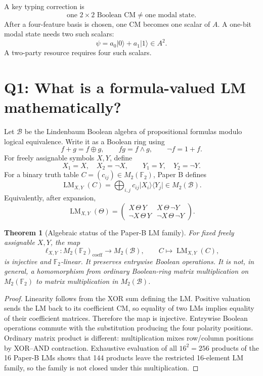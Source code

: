 \documentclass[11pt]{article}
\newtheorem{theorem}{Theorem}[section]
\theoremstyle{definition}
\newcommand{\F}{\mathbb{F}}
\newcommand{\B}{\mathcal{B}}
\newcommand{\LM}{\operatorname{LM}}
\begin{document}
A key typing correction is
\[
\boxed{\text{one }2\times2\text{ Boolean CM}\neq\text{one modal state}.}
\]
After a four-feature basis is chosen, one CM becomes one scalar of \(A\). A one-bit modal state needs
two such scalars:
\[
\psi=a_0\lvert0\rangle+a_1\lvert1\rangle\in A^2.
\]
A two-party resource requires four such scalars.

\section{Q1: What is a formula-valued LM mathematically?}

Let \(\B\) be the Lindenbaum Boolean algebra of propositional formulas modulo logical equivalence.
Write it as a Boolean ring using
\[
f+g=f\oplus g,\qquad fg=f\land g,\qquad \neg f=1+f.
\]
For freely assignable symbols \(X,Y\), define
\[
X_1=X,\quad X_2=\neg X,\qquad
Y_1=Y,\quad Y_2=\neg Y.
\]
For a binary truth table \(C=(c_{ij})\in M_2(\F_2)\), Paper B defines
\[
\LM_{X,Y}(C)
=
\bigoplus_{i,j}c_{ij}\lvert X_i\rangle\langle Y_j\rvert
\in M_2(\B).
\]
Equivalently, after expansion,
\[
\LM_{X,Y}(\Theta)
=
\begin{pmatrix}
X\,\Theta\,Y & X\,\Theta\,\neg Y\\
\neg X\,\Theta\,Y & \neg X\,\Theta\,\neg Y
\end{pmatrix}.
\]

\begin{theorem}[Algebraic status of the Paper-B LM family]
For fixed freely assignable \(X,Y\), the map
\[
\ell_{X,Y}:M_2(\F_2)_{\mathrm{coeff}}\longrightarrow M_2(\B),
\qquad C\longmapsto\LM_{X,Y}(C),
\]
is injective and \(\F_2\)-linear. It preserves entrywise Boolean operations. It is not, in general,
a homomorphism from ordinary Boolean-ring matrix multiplication on \(M_2(\F_2)\) to matrix
multiplication in \(M_2(\B)\).
\end{theorem}

\begin{proof}
Linearity follows from the XOR sum defining the LM. Positive valuation sends the LM back to its
coefficient CM, so equality of two LMs implies equality of their coefficient matrices. Therefore the
map is injective. Entrywise Boolean operations commute with the substitution producing the four
polarity positions. Ordinary matrix product is different: multiplication mixes row/column positions
by XOR--AND contraction. Exhaustive evaluation of all \(16^2=256\) products of the 16 Paper-B
LMs shows that 144 products leave the restricted 16-element LM family, so the family is not closed
under this multiplication.
\end{proof}
\end{document}
